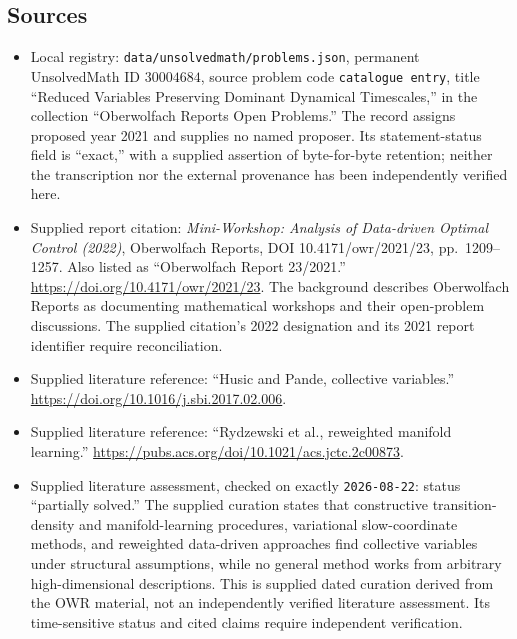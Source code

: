 \documentclass[11pt]{article}
\begin{document}
\subsection{Sources}
\begin{itemize}
\item Local registry: \texttt{data/unsolvedmath/problems.json}, permanent UnsolvedMath ID \(30004684\), source problem code \texttt{catalogue entry}, title ``Reduced Variables Preserving Dominant Dynamical Timescales,'' in the collection ``Oberwolfach Reports Open Problems.'' The record assigns proposed year 2021 and supplies no named proposer. Its statement-status field is ``exact,'' with a supplied assertion of byte-for-byte retention; neither the transcription nor the external provenance has been independently verified here.
\item Supplied report citation: \emph{Mini-Workshop: Analysis of Data-driven Optimal Control (2022)}, Oberwolfach Reports, DOI 10.4171/owr/2021/23, pp.~1209--1257. Also listed as ``Oberwolfach Report 23/2021.'' \url{https://doi.org/10.4171/owr/2021/23}. The background describes Oberwolfach Reports as documenting mathematical workshops and their open-problem discussions. The supplied citation's 2022 designation and its 2021 report identifier require reconciliation.
\item Supplied literature reference: ``Husic and Pande, collective variables.'' \url{https://doi.org/10.1016/j.sbi.2017.02.006}.
\item Supplied literature reference: ``Rydzewski et al., reweighted manifold learning.'' \url{https://pubs.acs.org/doi/10.1021/acs.jctc.2c00873}.
\item Supplied literature assessment, checked on exactly \texttt{2026-08-22}: status ``partially solved.'' The supplied curation states that constructive transition-density and manifold-learning procedures, variational slow-coordinate methods, and reweighted data-driven approaches find collective variables under structural assumptions, while no general method works from arbitrary high-dimensional descriptions. This is supplied dated curation derived from the OWR material, not an independently verified literature assessment. Its time-sensitive status and cited claims require independent verification.
\end{itemize}
\end{document}
